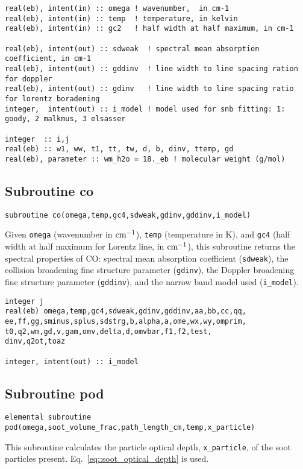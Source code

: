 \begin{lstlisting}
real(eb), intent(in) :: omega ! wavenumber,  in cm-1
real(eb), intent(in) :: temp  ! temperature, in kelvin
real(eb), intent(in) :: gc2   ! half width at half maximum, in cm-1

real(eb), intent(out) :: sdweak  ! spectral mean absorption coefficient, in cm-1
real(eb), intent(out) :: gddinv  ! line width to line spacing ration for doppler
real(eb), intent(out) :: gdinv   ! line width to line spacing ratio for lorentz boradening
integer,  intent(out) :: i_model ! model used for snb fitting: 1: goody, 2 malkmus, 3 elsasser

integer  :: i,j
real(eb) :: w1, ww, t1, tt, tw, d, b, dinv, ttemp, gd
real(eb), parameter :: wm_h2o = 18._eb ! molecular weight (g/mol)
\end{lstlisting}

\subsection{Subroutine co}
\label{sub:co}

\begin{lstlisting}
subroutine co(omega,temp,gc4,sdweak,gdinv,gddinv,i_model)
\end{lstlisting}
 Given \verb=omega= (wavenumber in $\rm cm^{-1}$), \verb=temp= (temperature in K), and \verb=gc4= (half width at half maximum for Lorentz line, in $\rm cm^{-1}$), this subroutine returns the spectral properties of CO: spectral mean absorption coefficient (\verb=sdweak=), the collision broadening fine structure parameter (\verb=gdinv=), the Doppler broadening fine structure parameter (\verb=gddinv=), and the narrow band model used (\verb=i_model=).

\begin{lstlisting}
integer j
real(eb) omega,temp,gc4,sdweak,gdinv,gddinv,aa,bb,cc,qq,
ee,ff,gg,sminus,splus,sdstrg,b,alpha,a,ome,wx,wy,omprim,
t0,q2,wm,gd,v,gam,omv,delta,d,omvbar,f1,f2,test,
dinv,q2ot,toaz

integer, intent(out) :: i_model
\end{lstlisting}

\subsection{Subroutine pod}
\label{sub:pod}

\begin{lstlisting}
elemental subroutine pod(omega,soot_volume_frac,path_length_cm,temp,x_particle)
\end{lstlisting}
This subroutine calculates the particle optical depth, \verb=x_particle=, of the soot particles present. Eq.~\ref{eq::soot_optical_depth} is used.

